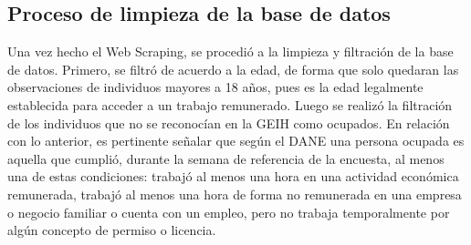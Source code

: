 \documentclass[10pt]{article}
\begin{document}
\subsection{Proceso de limpieza de la base de datos}
Una vez hecho el Web Scraping, se procedió a la limpieza y filtración de la base de datos. Primero, se filtró de acuerdo a la edad, de forma que solo quedaran las observaciones de individuos mayores a 18 años, pues es la edad legalmente establecida para acceder a un trabajo remunerado. Luego se realizó la filtración de los individuos que no se reconocían en la GEIH como ocupados. En relación con lo anterior, es pertinente señalar que según el DANE una persona ocupada es aquella que cumplió, durante la semana de referencia de la encuesta, al menos una de estas condiciones: trabajó al menos una hora en una actividad económica remunerada, trabajó al menos una hora de forma no remunerada en una empresa o negocio familiar o cuenta con un empleo, pero no trabaja temporalmente por algún concepto de permiso o licencia. 
\end{document}
